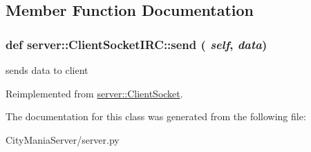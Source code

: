 \subsection{Member Function Documentation}
\hypertarget{classserver_1_1ClientSocketIRC_a513635125e7ae1ef86175971b09b9a0c}{
\subsubsection[{send}]{\setlength{\rightskip}{0pt plus 5cm}def server::ClientSocketIRC::send ( {\em self}, \/   {\em data})}}
\label{classserver_1_1ClientSocketIRC_a513635125e7ae1ef86175971b09b9a0c}
\begin{DoxyVerb}
sends data to client
\end{DoxyVerb}
 

Reimplemented from \hyperlink{classserver_1_1ClientSocket_af0ce9184f5505c6fee6cc4a767f84198}{server::ClientSocket}.

The documentation for this class was generated from the following file:\begin{DoxyCompactItemize}
\item 
CityManiaServer/server.py\end{DoxyCompactItemize}
